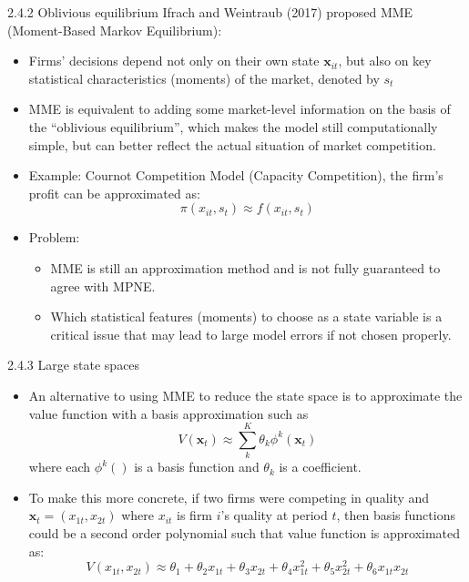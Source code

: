 \documentclass[aspectratio=169]{beamer}  %
\begin{document}
\begin{frame}
{2.4.2 Oblivious equilibrium}
Ifrach and Weintraub (2017) proposed MME (Moment-Based Markov Equilibrium):
\begin{itemize}
    \item Firms' decisions depend not only on their own state $\mathbf{x}_{it}$, but also on key statistical characteristics (moments) of the market, denoted by ${s}_{t}$
    \item MME is equivalent to adding some market-level information on the basis of the “oblivious equilibrium”, which makes the model still computationally simple, but can better reflect the actual situation of market competition.

    \item Example: Cournot Competition Model (Capacity Competition), the firm's profit can be approximated as:
    \[
    \pi(x_{it}, s_t) \approx f(x_{it}, s_t)
    \]
    \item Problem:
    \begin{itemize}
        \item MME is still an approximation method and is not fully guaranteed to agree with MPNE.
        \item Which statistical features (moments) to choose as a state variable is a critical issue that may lead to large model errors if not chosen properly.
    \end{itemize}
    
    
\end{itemize}
\end{frame}




\begin{frame}{2.4.3 Large state spaces}
\begin{itemize}
    \item An alternative to using MME to reduce the state space is to approximate the value function with a basis approximation such as 
    \[ 
    V(\mathbf{x}_t) \approx \sum_{k}^{K} \theta_k \phi^k(\mathbf{x}_t) 
    \] 
    where each \( \phi^k() \) is a basis function and \( \theta_k \) is a coefficient. 
    
    \item To make this more concrete, if two firms were competing in quality and \( \mathbf{x}_t = (x_{1t}, x_{2t}) \) where \( x_{it} \) is firm \( i \)'s quality at period \( t \), then basis functions could be a second order polynomial such that value function is approximated as:
    \[
    V(x_{1t}, x_{2t}) \approx \theta_1 + \theta_2 x_{1t} + \theta_3 x_{2t} + \theta_4 x_{1t}^2 + \theta_5 x_{2t}^2 + \theta_6 x_{1t} x_{2t} 
    \]
\end{itemize}
\end{frame}
\end{document}
